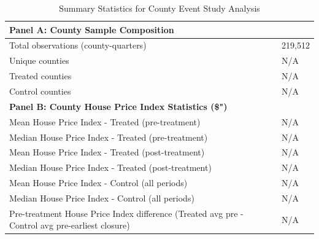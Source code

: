 \begin{table}[htbp]
\centering
\caption{Summary Statistics for County Event Study Analysis}
\label{tab:county_summary_statistics}
\begin{tabular}{@{}ll@{}}
\toprule
\multicolumn{2}{l}{\textbf{Panel A: County Sample Composition}} \\
\midrule
Total observations (county-quarters) & 219,512 \\
Unique counties & N/A \\
  \quad Treated counties & N/A \\
  \quad Control counties & N/A \\
\midrule
\multicolumn{2}{l}{\textbf{Panel B: County House Price Index Statistics (\$")}} \\
\midrule
Mean House Price Index - Treated (pre-treatment) & N/A \\
Median House Price Index - Treated (pre-treatment) & N/A \\
Mean House Price Index - Treated (post-treatment) & N/A \\
Median House Price Index - Treated (post-treatment) & N/A \\
Mean House Price Index - Control (all periods) & N/A \\
Median House Price Index - Control (all periods) & N/A \\
Pre-treatment House Price Index difference (Treated avg pre - Control avg pre-earliest closure) & N/A \\
\bottomrule
\end{tabular}
\end{table}

